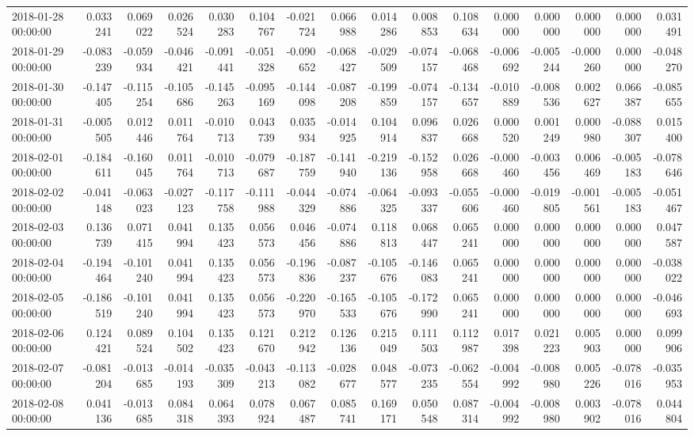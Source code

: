 \begin{tabular}{lrrrrrrrrrrrrrrr}
2018-01-28 00:00:00 & 0.033241 & 0.069022 & 0.026524 & 0.030283 & 0.104767 & -0.021724 & 0.066988 & 0.014286 & 0.008853 & 0.108634 & 0.000000 & 0.000000 & 0.000000 & 0.000000 & 0.031491 \\
2018-01-29 00:00:00 & -0.083239 & -0.059934 & -0.046421 & -0.091441 & -0.051328 & -0.090652 & -0.068427 & -0.029509 & -0.074157 & -0.068468 & -0.006692 & -0.005244 & -0.000260 & 0.000000 & -0.048270 \\
2018-01-30 00:00:00 & -0.147405 & -0.115254 & -0.105686 & -0.145263 & -0.095169 & -0.144098 & -0.087208 & -0.199859 & -0.074157 & -0.134657 & -0.010889 & -0.008536 & 0.002627 & 0.066387 & -0.085655 \\
2018-01-31 00:00:00 & -0.005505 & 0.012446 & 0.011764 & -0.010713 & 0.043739 & 0.035934 & -0.014925 & 0.104914 & 0.096837 & 0.026668 & 0.000520 & 0.001249 & 0.000980 & -0.088307 & 0.015400 \\
2018-02-01 00:00:00 & -0.184611 & -0.160045 & 0.011764 & -0.010713 & -0.079687 & -0.187759 & -0.141940 & -0.219136 & -0.152958 & 0.026668 & -0.000460 & -0.003456 & 0.006469 & -0.005183 & -0.078646 \\
2018-02-02 00:00:00 & -0.041148 & -0.063023 & -0.027123 & -0.117758 & -0.111988 & -0.044329 & -0.074886 & -0.064325 & -0.093337 & -0.055606 & -0.000460 & -0.019805 & -0.001561 & -0.005183 & -0.051467 \\
2018-02-03 00:00:00 & 0.136739 & 0.071415 & 0.041994 & 0.135423 & 0.056573 & 0.046456 & -0.074886 & 0.118813 & 0.068447 & 0.065241 & 0.000000 & 0.000000 & 0.000000 & 0.000000 & 0.047587 \\
2018-02-04 00:00:00 & -0.194464 & -0.101240 & 0.041994 & 0.135423 & 0.056573 & -0.196836 & -0.087237 & -0.105676 & -0.146083 & 0.065241 & 0.000000 & 0.000000 & 0.000000 & 0.000000 & -0.038022 \\
2018-02-05 00:00:00 & -0.186519 & -0.101240 & 0.041994 & 0.135423 & 0.056573 & -0.220970 & -0.165533 & -0.105676 & -0.172990 & 0.065241 & 0.000000 & 0.000000 & 0.000000 & 0.000000 & -0.046693 \\
2018-02-06 00:00:00 & 0.124421 & 0.089524 & 0.104502 & 0.135423 & 0.121670 & 0.212942 & 0.126136 & 0.215049 & 0.111503 & 0.112987 & 0.017398 & 0.021223 & 0.005903 & 0.000000 & 0.099906 \\
2018-02-07 00:00:00 & -0.081204 & -0.013685 & -0.014193 & -0.035309 & -0.043213 & -0.113082 & -0.028677 & 0.048577 & -0.073235 & -0.062554 & -0.004992 & -0.008980 & 0.005226 & -0.078016 & -0.035953 \\
2018-02-08 00:00:00 & 0.041136 & -0.013685 & 0.084318 & 0.064393 & 0.078924 & 0.067487 & 0.085741 & 0.169171 & 0.050548 & 0.087314 & -0.004992 & -0.008980 & 0.003902 & -0.078016 & 0.044804 \\

\end{tabular}
